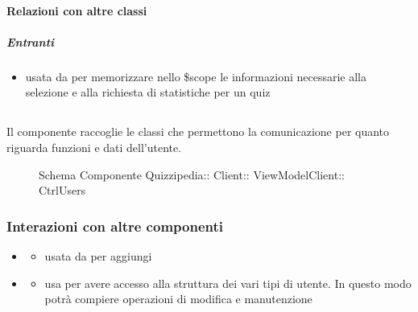 \paragraph{Relazioni con altre classi}
\subparagraph{Entranti}
\begin{itemize}
\item usata da  per memorizzare nello \$scope le informazioni necessarie alla selezione e alla richiesta di statistiche per un quiz
\end{itemize}
\subsection{}
Il componente raccoglie le classi che permettono la comunicazione per quanto riguarda funzioni e dati dell'utente.
\begin{figure}[H]
\centering
\noindent{}
\caption[Schema Componente CtrlUsers]{Schema Componente Quizzipedia:: Client:: ViewModelClient:: CtrlUsers}
\end{figure}
\subsubsection{Interazioni con altre componenti}
\begin{itemize}
\item {}
\begin{itemize}
\item usata da  per aggiungi
\end{itemize}
\item {}
\begin{itemize}
\item usa  per avere accesso alla struttura dei vari tipi di utente. In questo modo potrà compiere operazioni di modifica e manutenzione
\end{itemize}
\end{itemize}
